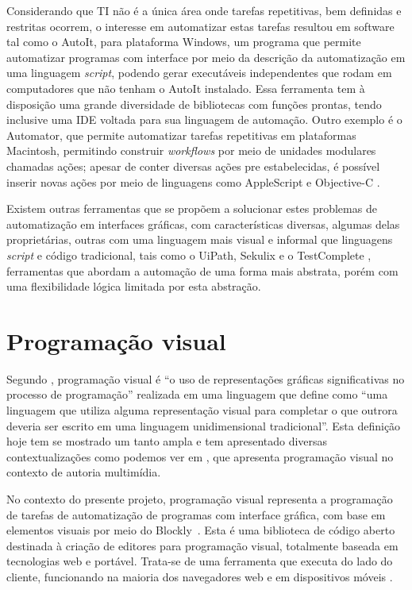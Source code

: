 \documentclass[tg]{mdtufsm}
\begin{document}
        	Considerando que TI não é a única área onde tarefas repetitivas, bem definidas e restritas ocorrem, o interesse em automatizar estas tarefas resultou em software tal como o AutoIt\cite{autoit}, para plataforma Windows, um programa que permite automatizar programas com interface por meio da descrição da automatização em uma linguagem \emph{script}, podendo gerar executáveis independentes que rodam em computadores que não tenham o AutoIt instalado. Essa ferramenta tem à disposição uma grande diversidade de bibliotecas com funções prontas, tendo inclusive uma IDE voltada para sua linguagem de automação. Outro exemplo é o Automator, que permite automatizar tarefas repetitivas em plataformas Macintosh, permitindo construir \emph{workflows} por meio de unidades modulares chamadas ações; apesar de conter diversas ações pre estabelecidas, é possível inserir novas ações por meio de linguagens como AppleScript e Objective-C \cite{automator}.

        	Existem outras ferramentas que se propõem a solucionar estes problemas de automatização em interfaces gráficas, com características diversas, algumas delas proprietárias, outras com uma linguagem mais visual e informal que linguagens \emph{script} e código tradicional, tais como o UiPath, Sekulix e o TestComplete \cite{uipath,testcomplete,sikuli}, ferramentas que abordam a automação de uma forma mais abstrata, porém com uma flexibilidade lógica limitada por esta abstração.

    	\section{Programação visual}

        	Segundo \citeauthor{visualProgram}\cite{visualProgram}, programação visual é ``o uso de representações gráficas significativas no processo de programação'' realizada em uma linguagem que \citeauthor{visualProgram} define como ``uma linguagem que utiliza alguma representação visual para completar o que outrora deveria ser escrito em uma linguagem unidimensional tradicional''. Esta definição hoje tem se mostrado um tanto ampla e tem apresentado diversas contextualizações como podemos ver em \cite{visualProgAuth}, que apresenta programação visual no contexto de autoria multimídia.

        	No contexto do presente projeto, programação visual representa a programação de tarefas de automatização de programas com interface gráfica, com base em elementos visuais por meio do Blockly~\cite{BlocklyResource}. Esta é uma biblioteca de código aberto destinada à criação de editores para programação visual, totalmente baseada em tecnologias web e portável. Trata-se de uma ferramenta que executa do lado do cliente, funcionando na maioria dos navegadores web e em dispositivos móveis \cite{BlocklyResource}.
\end{document}
